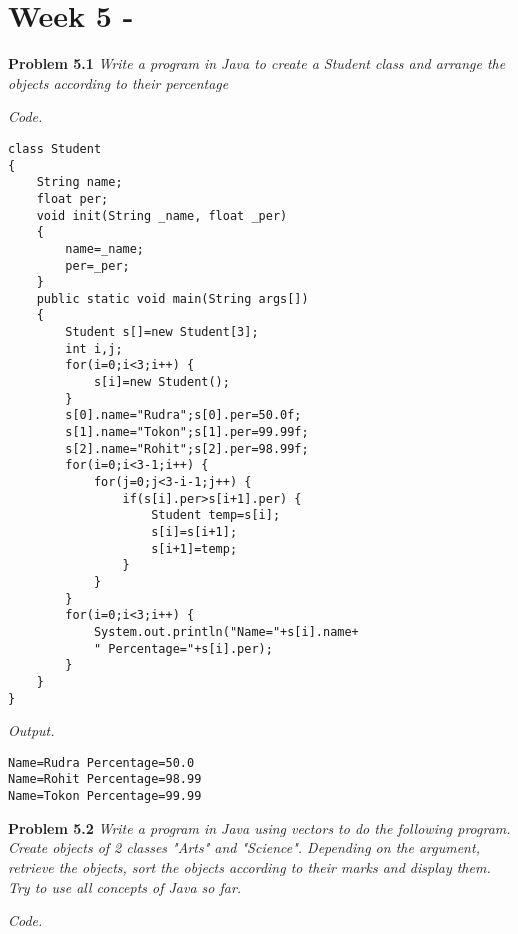 \documentclass[12pt]{article}
\begin{document}
\newpage

\setlength{\fboxrule}{.5mm}\setlength{\fboxsep}{1.2mm}
\addtolength{\boxlength}{-4mm}
\begin{center}\end{center}
\vspace{5mm}

\section{Week 5 - }

\textbf{Problem 5.1} \textit{Write a program in Java to create a Student class and arrange the objects according to their percentage}


\textit{Code.}

\begin{lstlisting}
class Student
{
	String name;
	float per;
	void init(String _name, float _per)
	{
		name=_name;
		per=_per;
	}
	public static void main(String args[])
	{
		Student s[]=new Student[3];
		int i,j;
		for(i=0;i<3;i++) {
			s[i]=new Student();
		}
		s[0].name="Rudra";s[0].per=50.0f;
		s[1].name="Tokon";s[1].per=99.99f;
		s[2].name="Rohit";s[2].per=98.99f;
		for(i=0;i<3-1;i++) {
			for(j=0;j<3-i-1;j++) {
				if(s[i].per>s[i+1].per) {
					Student temp=s[i];
					s[i]=s[i+1];
					s[i+1]=temp;
				}
			}
		}
		for(i=0;i<3;i++) {
			System.out.println("Name="+s[i].name+
			" Percentage="+s[i].per);
		}
	}
}
\end{lstlisting}
\textit{Output.}
\begin{lstlisting}
Name=Rudra Percentage=50.0
Name=Rohit Percentage=98.99
Name=Tokon Percentage=99.99
\end{lstlisting}

\textbf{Problem 5.2} \textit{Write a program in Java using vectors to do the following program. Create objects of 2 classes "Arts" and "Science". Depending on the argument, retrieve the objects, sort the objects according to their marks and display them. Try to use all concepts of Java so far.}


\textit{Code.}
\end{document}
